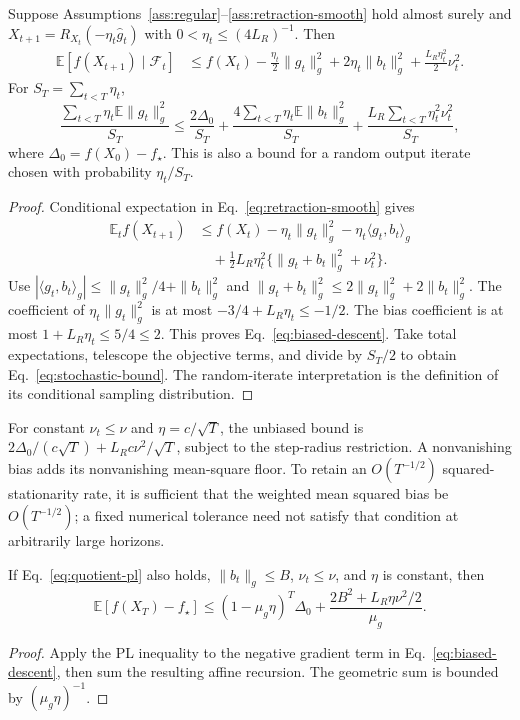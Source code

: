 \begin{theorem}
\label{thm:stochastic}
Suppose Assumptions~\ref{ass:regular}--\ref{ass:retraction-smooth} hold
almost surely and $X_{t+1}=R_{X_t}(-\eta_t\widehat g_t)$ with
$0<\eta_t\leq(4L_R)^{-1}$. Then
\begin{align}
 \mathbb E[f(X_{t+1})\mid\mathcal F_t]
 &\leq f(X_t)-\frac{\eta_t}{2}\|g_t\|_g^2
     +2\eta_t\|b_t\|_g^2+\frac{L_R\eta_t^2}{2}\nu_t^2.
 \label{eq:biased-descent}
\end{align}
For $S_T=\sum_{t<T}\eta_t$,
\begin{equation}
 \frac{\sum_{t<T}\eta_t\mathbb E\|g_t\|_g^2}{S_T}
 \leq\frac{2\Delta_0}{S_T}
 +\frac{4\sum_{t<T}\eta_t\mathbb E\|b_t\|_g^2}{S_T}
 +\frac{L_R\sum_{t<T}\eta_t^2\nu_t^2}{S_T},
 \label{eq:stochastic-bound}
\end{equation}
where $\Delta_0=f(X_0)-f_\star$. This is also a bound for a random
output iterate chosen with probability $\eta_t/S_T$.
\end{theorem}
\begin{proof}
Conditional expectation in Eq.~\eqref{eq:retraction-smooth} gives
\begin{align}
 \mathbb E_t f(X_{t+1})
 &\leq f(X_t)-\eta_t\|g_t\|_g^2-\eta_t\langle g_t,b_t\rangle_g\\
 &\quad+\tfrac12L_R\eta_t^2\{\|g_t+b_t\|_g^2+\nu_t^2\}.
\end{align}
Use $|\langle g_t,b_t\rangle_g|\leq\|g_t\|_g^2/4+\|b_t\|_g^2$
and $\|g_t+b_t\|_g^2\leq2\|g_t\|_g^2+2\|b_t\|_g^2$.
The coefficient of $\eta_t\|g_t\|_g^2$ is at most
$-3/4+L_R\eta_t\leq-1/2$. The bias coefficient is at most
$1+L_R\eta_t\leq5/4\leq2$. This proves
Eq.~\eqref{eq:biased-descent}. Take total expectations, telescope the
objective terms, and divide by $S_T/2$ to obtain
Eq.~\eqref{eq:stochastic-bound}. The random-iterate interpretation is
the definition of its conditional sampling distribution.
\end{proof}

For constant $\nu_t\leq\nu$ and $\eta=c/\sqrt T$, the unbiased bound
is $2\Delta_0/(c\sqrt T)+L_Rc\nu^2/\sqrt T$, subject to the step-radius
restriction. A nonvanishing bias adds its nonvanishing mean-square floor.
To retain an $O(T^{-1/2})$ squared-stationarity rate, it is sufficient
that the weighted mean squared bias be $O(T^{-1/2})$; a fixed numerical
tolerance need not satisfy that condition at arbitrarily large horizons.

\begin{corollary}
\label{cor:stochastic-pl}
If Eq.~\eqref{eq:quotient-pl} also holds, $\|b_t\|_g\leq B$,
$\nu_t\leq\nu$, and $\eta$ is constant, then
\begin{equation}
 \mathbb E[f(X_T)-f_\star]
 \leq(1-\mu_g\eta)^T\Delta_0+
 \frac{2B^2+L_R\eta\nu^2/2}{\mu_g}.
 \label{eq:stochastic-pl-floor}
\end{equation}
\end{corollary}
\begin{proof}
Apply the PL inequality to the negative gradient term in
Eq.~\eqref{eq:biased-descent}, then sum the resulting affine recursion.
The geometric sum is bounded by $(\mu_g\eta)^{-1}$.
\end{proof}

